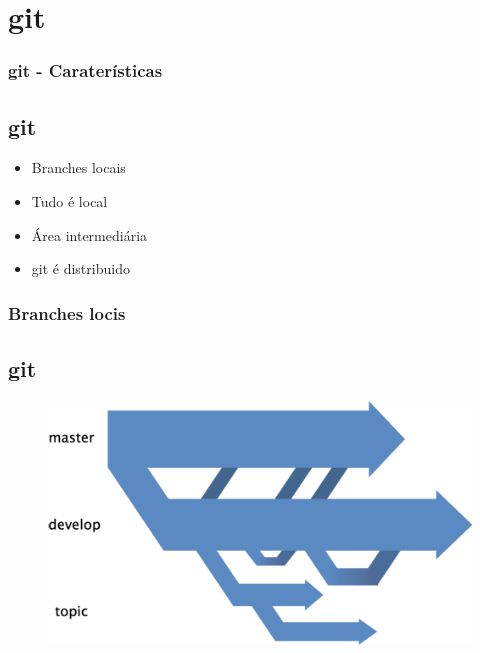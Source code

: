 \documentclass{beamer}
\begin{document}
  \section{git}
  \begin{frame}
    \frametitle{git - Caraterísticas}
    \subsection{git}
    \begin{itemize}
      \item Branches locais
      \item Tudo é local
      \item Área intermediária
      \item git é distribuido
    \end{itemize}
    \vfill
  \end{frame}

  \begin{frame}
    \frametitle{Branches locis}
    \subsection{git}
    \begin{figure}[htb]
     \begin{center}
    	\includegraphics[scale=0.7]{branches.png}
     \end{center}
    \end{figure}
    \vfill
  \end{frame}
\end{document}
